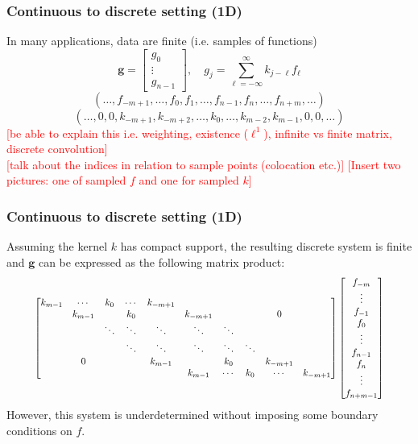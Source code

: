 \documentclass{beamer}
\newcommand{\ToDo}[1]{\textcolor{red}{[#1]}}
\newcommand{\gVec}{\mathbf{g}}	%
\begin{document}
\begin{frame}
\frametitle{Continuous to discrete setting (1D)}
In many applications, data are finite (i.e. samples of functions)
\[\gVec = \begin{bmatrix}
g_0 \\
\vdots \\
g_{n-1}
\end{bmatrix}, \quad g_j = \sum_{\ell=-\infty}^{\infty} k_{j-\ell}f_{\ell}\]
\[(\ldots,f_{-m+1},\ldots,f_0,f_1,\ldots,f_{n-1},f_n,\ldots,f_{n+m},\ldots)\]
\[(\ldots,0,0,k_{-m+1},k_{-m+2},\ldots,k_0,\ldots,k_{m-2},k_{m-1},0,0,\ldots)\]
\ToDo{be able to explain this i.e. weighting, existence ($\ell^1$), infinite vs finite matrix, discrete convolution} \\
\ToDo{talk about the indices in relation to sample points (colocation etc.)}
\ToDo{Insert two pictures: one of sampled $f$ and one for sampled $k$}
\end{frame}

\begin{frame}
\frametitle{Continuous to discrete setting (1D)}
Assuming the kernel $k$ has compact support, the resulting discrete system is finite and $\gVec$ can be expressed as the following matrix product:
\[\resizebox{.9 \textwidth}{!}{$
\begin{bmatrix}
k_{m-1} & \cdots & k_0 & \cdots & k_{-m+1} & & & & & \\
 & k_{m-1} & & k_0 & & k_{-m+1} & & & 0 & \\
 & & \ddots & \ddots & \ddots & \ddots & \ddots & & & \\
 & & & \ddots & \ddots & \ddots & \ddots & \ddots & & \\
 & 0 & & & k_{m-1} & & k_0 & & k_{-m+1} & \\
 & & & & & k_{m-1} & \cdots & k_0 & \cdots & k_{-m+1}
\end{bmatrix}\begin{bmatrix}
f_{-m} \\
\vdots \\
f_{-1} \\
f_0 \\
\vdots \\
f_{n-1} \\
f_n \\
\vdots \\
f_{n+m-1}
\end{bmatrix}$}\]
However, this system is underdetermined without imposing some boundary conditions on $f$.
\end{frame}
\end{document}
